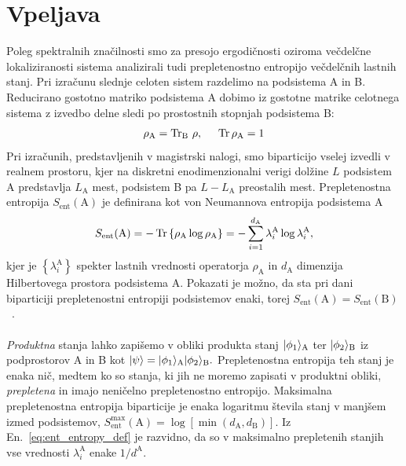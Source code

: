 \section{Vpeljava}
Poleg spektralnih značilnosti smo za presojo ergodičnosti oziroma večdelčne lokaliziranosti sistema analizirali tudi prepletenostno entropijo večdelčnih lastnih stanj. Pri izračunu slednje celoten sistem razdelimo na podsistema A in B. Reducirano gostotno matriko podsistema A dobimo iz gostotne matrike celotnega sistema z izvedbo delne sledi po prostostnih stopnjah podsistema B:
\begin{equation}
\rho_\mathrm{A}=\mathrm{Tr}_\mathrm{B}\ \rho, \hspace{5mm} \mathop{\rm Tr}{\rho_\mathrm{A}}=1
\end{equation}
Pri izračunih, predstavljenih v magistrski nalogi, smo biparticijo vselej izvedli v realnem prostoru, kjer na diskretni enodimenzionalni verigi dolžine $L$ podsistem A predstavlja $L_\mathrm{A}$ mest, podsistem B pa $L-L_\mathrm{A}$ preostalih mest. Prepletenostna entropija $S_\mathrm{ent}(\mathrm{A})$ je definirana kot von Neumannova entropija podsistema A
\begin{equation}\label{eq:ent_entropy_def}
S_\mathrm{ent}(\mathrm{A})=-\mathop{\rm Tr}\left\{\rho_\mathrm{A} \log \rho_\mathrm{A}\right\}=-\sum\limits_{i=1}^{d_\mathrm{A}} \lambda_i^\mathrm{A} \log \lambda_i^\mathrm{A},
\end{equation} 
kjer je $\left\{\lambda_i^\mathrm{A}\right\}$ spekter lastnih vrednosti operatorja $\rho_\mathrm{A}$ in
$d_\mathrm{A}$ dimenzija Hilbertovega prostora podsistema A. Pokazati je možno, da sta pri dani biparticiji prepletenostni entropiji podsistemov enaki, torej $S_\mathrm{ent}(\mathrm{A})=S_\mathrm{ent}(\mathrm{B})$~\cite{grassellientanglement}.\\\\ 
\emph{Produktna} stanja lahko zapišemo v obliki produkta stanj $\vert\phi_1\rangle_\mathrm{A}$ ter $\vert\phi_2\rangle_\mathrm{B}$ iz podprostorov A in B kot $\vert\psi\rangle=\vert\phi_1\rangle_\mathrm{A}\vert\phi_2\rangle_\mathrm{B}.$ Prepletenostna entropija teh stanj je enaka nič, medtem ko so stanja, ki jih ne moremo zapisati v produktni obliki, \emph{prepletena} in imajo neničelno prepletenostno entropijo. Maksimalna prepletenostna entropija biparticije je enaka logaritmu števila stanj v manjšem izmed podsistemov, $S_\mathrm{ent}^\mathrm{max}(\mathrm{A})=\log\left[\min\left(d_\mathrm{A}, d_\mathrm{B}\right)\right].$ Iz En.~\eqref{eq:ent_entropy_def} je razvidno, da so v maksimalno prepletenih stanjih vse vrednosti $\lambda_i^\mathrm{A}$ enake $1/d^\mathrm{A}.$ \\\\
